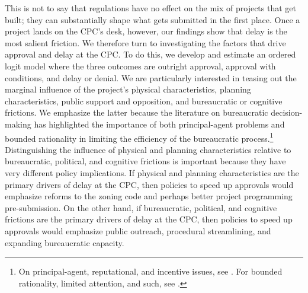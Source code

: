 This is not to say that regulations have no effect on the mix of projects that get built; they can substantially shape what gets submitted in the first place. Once a project lands on the CPC's desk, however, our findings show that delay is the most salient friction. We therefore turn to investigating the factors that drive approval and delay at the CPC. To do this, we develop and estimate an ordered logit model where the three outcomes are outright approval, approval with conditions, and delay or denial. We are particularly interested in teasing out the marginal influence of the project's physical characteristics, planning characteristics, public support and opposition, and bureaucratic or cognitive frictions. We emphasize the latter because the literature on bureaucratic decision-making has highlighted the importance of both principal-agent problems and bounded rationality in limiting the efficiency of the bureaucratic process.\footnote{On principal-agent, reputational, and incentive issues, see \citet{Dixit2002, Prendergast2003, BesleyGhatak2003, Black2008, CarpenterKrause2012, DamonteDunlopRadaelli2014, BusuiocLodge2016, MaggettiPapadopoulos2018}. For bounded rationality, limited attention, and such, see \citet{Radner1993, VanZandt1999, Sims2003, Guth2010, Salant2011, LimMatrosTurocy2014, ZhangLevin2017, deClippelRozen2021, Richters2021, HebertWoodford2023}.} Distinguishing the influence of physical and planning characteristics relative to bureaucratic, political, and cognitive frictions is important because they have very different policy implications. If physical and planning characteristics are the primary drivers of delay at the CPC, then policies to speed up approvals would emphasize reforms to the zoning code and perhaps better project programming pre-submission. On the other hand, if bureaucratic, political, and cognitive frictions are the primary drivers of delay at the CPC, then policies to speed up approvals would emphasize public outreach, procedural streamlining, and expanding bureaucratic capacity.


